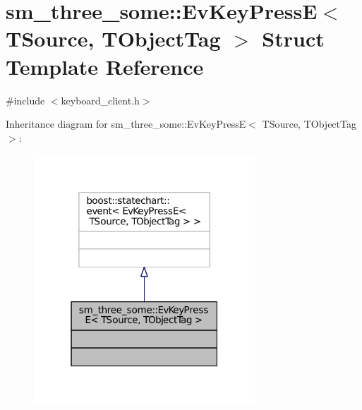 \hypertarget{structsm__three__some_1_1EvKeyPressE}{}\section{sm\+\_\+three\+\_\+some\+:\+:Ev\+Key\+PressE$<$ T\+Source, T\+Object\+Tag $>$ Struct Template Reference}
\label{structsm__three__some_1_1EvKeyPressE}


{\ttfamily \#include $<$keyboard\+\_\+client.\+h$>$}



Inheritance diagram for sm\+\_\+three\+\_\+some\+:\+:Ev\+Key\+PressE$<$ T\+Source, T\+Object\+Tag $>$\+:
\nopagebreak
\begin{figure}[H]
\begin{center}
\leavevmode
\includegraphics[width=235pt]{structsm__three__some_1_1EvKeyPressE__inherit__graph}
\end{center}
\end{figure}


